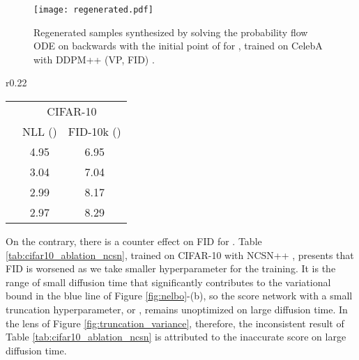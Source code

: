 \documentclass[nohyperref]{article}
\theoremstyle{plain}
\theoremstyle{definition}
\theoremstyle{remark}
\begin{document}
\begin{figure}[t]
		\centering
		\texttt{[image: regenerated.pdf]}
		\caption{Regenerated samples synthesized by solving the probability flow ODE on  backwards with the initial point of  for , trained on CelebA with DDPM++ (VP, FID) \cite{song2020score}.}
		\label{fig:regenerated}
		\vskip -0.1in
\end{figure}

\begin{wraptable}{r}{0.22\textwidth}
\vskip -0.13in
\centering
	\caption{Ablation on .}
	\label{tab:cifar10_ablation_ncsn}
	\tiny
	\begin{tabular}{ccc}
		\toprule
		\multirow{2}{*}{} & \multicolumn{2}{c}{CIFAR-10}\\
		& NLL () & FID-10k () \\\midrule
		 & 4.95 & 6.95 \\
		 & 3.04 & 7.04 \\
		 & 2.99 & 8.17 \\
		 & 2.97 & 8.29 \\
		\bottomrule
	\end{tabular}
\end{wraptable}
On the contrary, there is a counter effect on FID for . Table \ref{tab:cifar10_ablation_ncsn}, trained on CIFAR-10 \cite{krizhevsky2009learning} with NCSN++ \cite{song2020score}, presents that FID is worsened as we take smaller hyperparameter  for the training. It is the range of small diffusion time that significantly contributes to the variational bound in the blue line of Figure \ref{fig:nelbo}-(b), so the score network with a small truncation hyperparameter,  or , remains unoptimized on large diffusion time. In the lens of Figure \ref{fig:truncation_variance}, therefore, the inconsistent result of Table \ref{tab:cifar10_ablation_ncsn} is attributed to the inaccurate score on large diffusion time.
\end{document}
